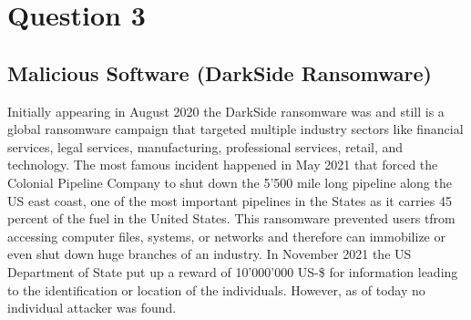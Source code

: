 \documentclass{report}
\begin{document}
	\section{Question 3}
	\startsection
		\renewcommand{\thesubsection}{\thesection.\Alph{subsection}}
		\subsection{Malicious Software (DarkSide Ransomware)}
		\startsubsection
			Initially appearing in August 2020 the DarkSide ransomware was and still is a global ransomware campaign that targeted multiple industry sectors like financial services, legal services, manufacturing, professional services, retail, and technology. The most famous incident happened in May 2021 that forced the Colonial Pipeline Company to shut down the 5'500 mile long pipeline along the US east coast, one of the most important pipelines in the States as it carries 45 percent of the fuel in the United States. This ransomware prevented users tfrom accessing computer files, systems, or networks and therefore can immobilize or even shut down huge branches of an industry. In November 2021 the US Department of State put up a reward of 10'000'000 US-\$ for information leading to the  identification or location of the individuals. However, as of today no individual attacker was found.
		\closesection
	\closesection
\end{document}
